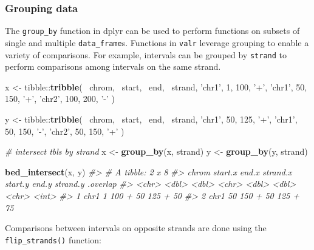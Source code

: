 \documentclass[9pt,a4paper]{extarticle}
\renewcommand{\KeywordTok}[1]{\textbf{{#1}}}
\renewcommand{\DecValTok}[1]{\textcolor[rgb]{0.00,0.00,1.00}{{#1}}}
\renewcommand{\StringTok}[1]{\textcolor[rgb]{0.87,0.00,0.00}{{#1}}}
\renewcommand{\CommentTok}[1]{\textcolor[rgb]{0.50,0.50,0.50}{\textit{{#1}}}}
\renewcommand{\NormalTok}[1]{{#1}}
\begin{document}
\subsubsection*{Grouping data}\label{grouping-data}

The \texttt{group\_by} function in dplyr can be used to perform functions
on subsets of single and multiple \texttt{data\_frame}s. Functions in
\texttt{valr} leverage grouping to enable a variety of comparisons. For
example, intervals can be grouped by \texttt{strand} to perform
comparisons among intervals on the same strand.

\begin{Highlighting}[]
\NormalTok{x <-}\StringTok{ }\NormalTok{tibble::}\KeywordTok{tribble}\NormalTok{(}
  \NormalTok{~chrom, ~start, ~end, ~strand,}
  \StringTok{'chr1'}\NormalTok{, }\DecValTok{1}\NormalTok{,      }\DecValTok{100}\NormalTok{,  }\StringTok{'+'}\NormalTok{,}
  \StringTok{'chr1'}\NormalTok{, }\DecValTok{50}\NormalTok{,     }\DecValTok{150}\NormalTok{,  }\StringTok{'+'}\NormalTok{,}
  \StringTok{'chr2'}\NormalTok{, }\DecValTok{100}\NormalTok{,    }\DecValTok{200}\NormalTok{,  }\StringTok{'-'}
\NormalTok{)}

\NormalTok{y <-}\StringTok{ }\NormalTok{tibble::}\KeywordTok{tribble}\NormalTok{(}
  \NormalTok{~chrom, ~start, ~end, ~strand,}
  \StringTok{'chr1'}\NormalTok{, }\DecValTok{50}\NormalTok{,     }\DecValTok{125}\NormalTok{,  }\StringTok{'+'}\NormalTok{,}
  \StringTok{'chr1'}\NormalTok{, }\DecValTok{50}\NormalTok{,     }\DecValTok{150}\NormalTok{,  }\StringTok{'-'}\NormalTok{,}
  \StringTok{'chr2'}\NormalTok{, }\DecValTok{50}\NormalTok{,     }\DecValTok{150}\NormalTok{,  }\StringTok{'+'}
\NormalTok{)}

\CommentTok{# intersect tbls by strand}
\NormalTok{x <-}\StringTok{ }\KeywordTok{group_by}\NormalTok{(x, strand)}
\NormalTok{y <-}\StringTok{ }\KeywordTok{group_by}\NormalTok{(y, strand)}

\KeywordTok{bed_intersect}\NormalTok{(x, y)}
\CommentTok{#> # A tibble: 2 x 8}
\CommentTok{#>   chrom start.x end.x strand.x start.y end.y strand.y .overlap}
\CommentTok{#>   <chr>   <dbl> <dbl>    <chr>   <dbl> <dbl>    <chr>    <int>}
\CommentTok{#> 1  chr1       1   100        +      50   125        +       50}
\CommentTok{#> 2  chr1      50   150        +      50   125        +       75}
\end{Highlighting}

Comparisons between intervals on opposite strands are done using the
\texttt{flip\_strands()} function:
\end{document}
